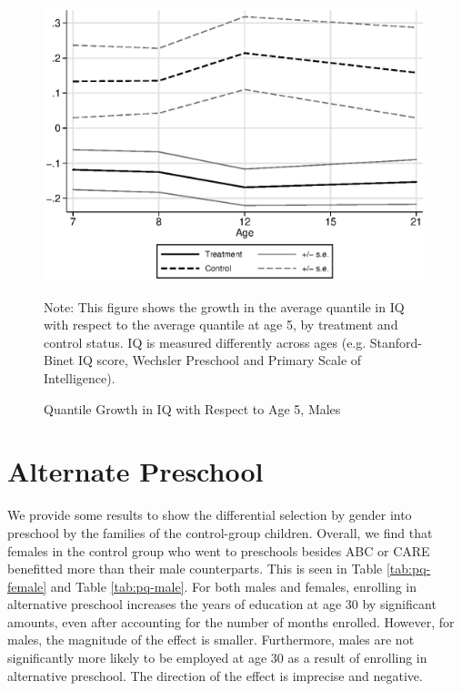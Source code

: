 \begin{figure}[htbp]
\begin{center}
	\caption{Quantile Growth in IQ with Respect to Age 5, Males} \label{fig:iq-rank-male}
	\includegraphics[width=30em]{output/abccareiqranks_1}
\end{center}
\raggedright \footnotesize
Note: This figure shows the growth in the average quantile in IQ with respect to the average quantile at age 5, by treatment and control status. IQ is measured differently across ages (e.g. Stanford-Binet IQ score, Wechsler Preschool and Primary Scale of Intelligence). 
\end{figure}

\section{Alternate Preschool}

We provide some results to show the differential selection by gender into preschool by the families of the control-group children. Overall, we find that females in the control group who went to preschools besides ABC or CARE benefitted more than their male counterparts. This is seen in Table \ref{tab:pq-female} and Table \ref{tab:pq-male}. For both males and females, enrolling in alternative preschool increases the years of education at age 30 by significant amounts, even after accounting for the number of months enrolled. However, for males, the magnitude of the effect is smaller. Furthermore, males are not significantly more likely to be employed at age 30 as a result of enrolling in alternative preschool. The direction of the effect is imprecise and negative.


